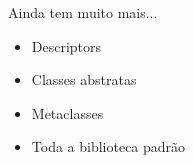 \begin{frame}{Ainda tem muito mais...}
	\begin{itemize}
		\item Descriptors
		\item Classes abstratas
		\item Metaclasses
		\item Toda a biblioteca padrão
	\end{itemize}
\end{frame}